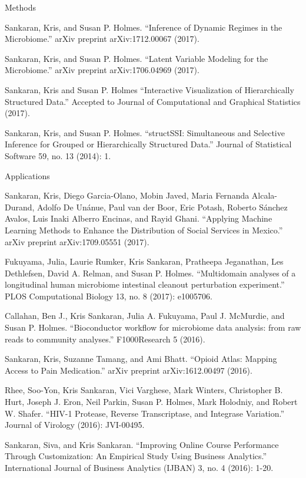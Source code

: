 \documentclass[letterpaper]{article}
\renewenvironment{itemize}{
  \begin{list}{}{
    \setlength{\leftmargin}{1.5em}
  }
}{
  \end{list}
}
\begin{document}
\begin{itemize}
  \item Methods
\begin{itemize}
 \item Sankaran, Kris, and Susan P. Holmes. ``Inference of Dynamic Regimes in
   the Microbiome.'' arXiv preprint arXiv:1712.00067 (2017).
\item Sankaran, Kris, and Susan P. Holmes. ``Latent Variable Modeling for the
  Microbiome.'' arXiv preprint arXiv:1706.04969 (2017).
\item Sankaran, Kris and Susan P. Holmes ``Interactive Visualization of
  Hierarchically Structured Data.'' Accepted to Journal of Computational and
  Graphical Statistics (2017).
\item Sankaran, Kris, and Susan P. Holmes. ``structSSI: Simultaneous and Selective
  Inference for Grouped or Hierarchically Structured Data.'' Journal of
  Statistical Software 59, no. 13 (2014): 1.
\end{itemize}
\item Applications
  \begin{itemize}
  \item Sankaran, Kris, Diego Garcia-Olano, Mobin Javed, Maria Fernanda
    Alcala-Durand, Adolfo De Unánue, Paul van der Boor, Eric Potash, Roberto
    S\'anchez Avalos, Luis Inaki Alberro Encinas, and Rayid Ghani. ``Applying
    Machine Learning Methods to Enhance the Distribution of Social Services in
    Mexico.'' arXiv preprint arXiv:1709.05551 (2017).
  \item Fukuyama, Julia, Laurie Rumker, Kris Sankaran, Pratheepa Jeganathan, Les
    Dethlefsen, David A. Relman, and Susan P. Holmes. ``Multidomain analyses of a
    longitudinal human microbiome intestinal cleanout perturbation experiment.''
    PLOS Computational Biology 13, no. 8 (2017): e1005706.
  \item Callahan, Ben J., Kris Sankaran, Julia A. Fukuyama, Paul J. McMurdie, and
    Susan P. Holmes. ``Bioconductor workflow for microbiome data analysis: from
    raw reads to community analyses.'' F1000Research 5 (2016).
  \item Sankaran, Kris, Suzanne Tamang, and Ami Bhatt. ``Opioid Atlas: Mapping
    Access to Pain Medication.'' arXiv preprint arXiv:1612.00497 (2016).
  \item Rhee, Soo-Yon, Kris Sankaran, Vici Varghese, Mark Winters, Christopher B.
    Hurt, Joseph J. Eron, Neil Parkin, Susan P. Holmes, Mark Holodniy, and Robert
    W. Shafer. ``HIV-1 Protease, Reverse Transcriptase, and Integrase Variation.''
    Journal of Virology (2016): JVI-00495.
  \item Sankaran, Siva, and Kris Sankaran. ``Improving Online Course Performance
    Through Customization: An Empirical Study Using Business Analytics.''
    International Journal of Business Analytics (IJBAN) 3, no. 4 (2016): 1-20.
  \end{itemize}
\end{itemize}
\end{document}
